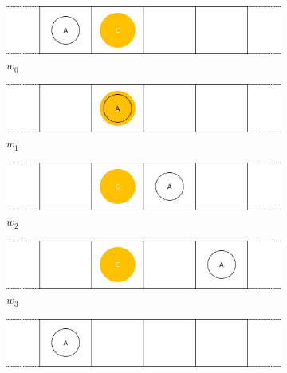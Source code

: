 \begin{figure}[H]
  \centering
  \begin{subfigure}{0.48\textwidth}
    \centering
    \includegraphics[width=\textwidth]{5BeyondSBDRL/GlobalAlgebras/Images/Consumable_world_states/w0.png}
    \caption{$w_{0}$}
    \label{fig:w0}
  \end{subfigure}%
  \hfill
  \begin{subfigure}{0.48\textwidth}
    \centering
    \includegraphics[width=\textwidth]{5BeyondSBDRL/GlobalAlgebras/Images/Consumable_world_states/w1.png}
    \caption{$w_{1}$}
    \label{fig:w1}
  \end{subfigure}%
  \vspace{0.5cm}
  \begin{subfigure}{0.48\textwidth}
    \centering
    \includegraphics[width=\textwidth]{5BeyondSBDRL/GlobalAlgebras/Images/Consumable_world_states/w2.png}
    \caption{$w_{2}$}
    \label{fig:w2}
  \end{subfigure}%
  \hfill
  \begin{subfigure}{0.48\textwidth}
    \centering
    \includegraphics[width=\textwidth]{5BeyondSBDRL/GlobalAlgebras/Images/Consumable_world_states/w3.png}
    \caption{$w_{3}$}
    \label{fig:w3}
  \end{subfigure}%
  \vspace{0.5cm}
  \begin{subfigure}{0.48\textwidth}
    \centering
    \includegraphics[width=\textwidth]{5BeyondSBDRL/GlobalAlgebras/Images/Consumable_world_states/w4.png}

\end{subfigure}
\end{figure}
